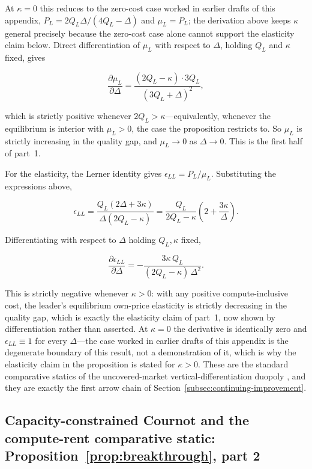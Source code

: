 \documentclass[11pt]{article}
\begin{document}
At $\kappa=0$ this reduces to the zero-cost case worked in earlier drafts of this appendix, $P_L=2Q_L\Delta/(4Q_L-\Delta)$ and $\mu_L=P_L$; the derivation above keeps $\kappa$ general precisely because the zero-cost case alone cannot support the elasticity claim below. Direct differentiation of $\mu_L$ with respect to $\Delta$, holding $Q_L$ and $\kappa$ fixed, gives

\begin{equation}\frac{\partial\mu_L}{\partial\Delta}=\frac{(2Q_L-\kappa)\cdot 3Q_L}{(3Q_L+\Delta)^{2}},\end{equation}

which is strictly positive whenever $2Q_L>\kappa$---equivalently, whenever the equilibrium is interior with $\mu_L>0$, the case the proposition restricts to. So $\mu_L$ is strictly increasing in the quality gap, and $\mu_L\to0$ as $\Delta\to0$. This is the first half of part~1.

For the elasticity, the Lerner identity gives $\epsilon_{LL}=P_L/\mu_L$. Substituting the expressions above,

\begin{equation}\epsilon_{LL}=\frac{Q_L(2\Delta+3\kappa)}{\Delta(2Q_L-\kappa)}=\frac{Q_L}{2Q_L-\kappa}\left(2+\frac{3\kappa}{\Delta}\right).\end{equation}

Differentiating with respect to $\Delta$ holding $Q_L,\kappa$ fixed,

\begin{equation}\frac{\partial\epsilon_{LL}}{\partial\Delta}=-\frac{3\kappa\,Q_L}{(2Q_L-\kappa)\,\Delta^{2}}.\end{equation}

This is strictly negative whenever $\kappa>0$: with any positive compute-inclusive cost, the leader's equilibrium own-price elasticity is strictly decreasing in the quality gap, which is exactly the elasticity claim of part~1, now shown by differentiation rather than asserted. At $\kappa=0$ the derivative is identically zero and $\epsilon_{LL}\equiv1$ for every $\Delta$---the case worked in earlier drafts of this appendix is the degenerate boundary of this result, not a demonstration of it, which is why the elasticity claim in the proposition is stated for $\kappa>0$. These are the standard comparative statics of the uncovered-market vertical-differentiation duopoly \citep{shakedSutton1982,singhVives1984}, and they are exactly the first arrow chain of Section~\ref{subsec:continuing-improvement}.

\subsection{Capacity-constrained Cournot and the compute-rent comparative static: Proposition~\ref{prop:breakthrough}, part 2}
\label{subsec:app-cournot-breakthrough}
\end{document}
